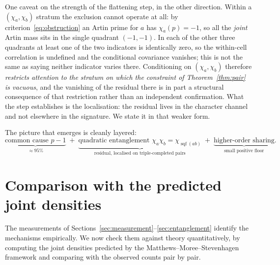 \documentclass[11pt,reqno]{amsart}
\theoremstyle{plain}
\theoremstyle{definition}
\DeclareMathOperator{\sqf}{sqf}
\begin{document}
One caveat on the strength of the flattening step, in the other direction.
Within a $(\chi_a, \chi_b)$ stratum the exclusion cannot operate at all: by
criterion~\eqref{eq:obstruction} an Artin prime for $a$ has $\chi_a(p) = -1$, so all the \emph{joint} Artin mass sits in the single quadrant $(-1,-1)$. In each of the other three quadrants at least one of the two indicators is identically zero, so the within-cell correlation is undefined and the conditional covariance vanishes; this is not the same as saying neither indicator varies there. Conditioning on
$(\chi_a, \chi_b)$ therefore \emph{restricts attention to the stratum on which
the constraint of Theorem~\ref{thm:pair} is vacuous}, and the vanishing of the
residual there is in part a structural consequence of that restriction rather
than an independent confirmation. What the step establishes is the
localisation: the residual lives in the character channel and not elsewhere in
the signature. We state it in that weaker form.

The picture that emerges is cleanly layered:
\[
  \underbrace{\text{common cause } p-1}_{\approx 95\%}
  \;+\;
  \underbrace{\text{quadratic entanglement } \chi_a\chi_b = \chi_{\sqf(ab)}}_{\text{residual, localised on triple-completed pairs}}
  \;+\;
  \underbrace{\text{higher-order sharing}}_{\text{small positive floor}}.
\]




\section{Comparison with the predicted joint densities}
\label{sec:model}

The measurements of Sections~\ref{sec:measurement}--\ref{sec:entanglement}
identify the mechanisms empirically. We now check them against theory
quantitatively, by computing the joint densities predicted by the
Matthews--Moree--Stevenhagen framework and comparing with the observed counts pair by
pair.
\end{document}

